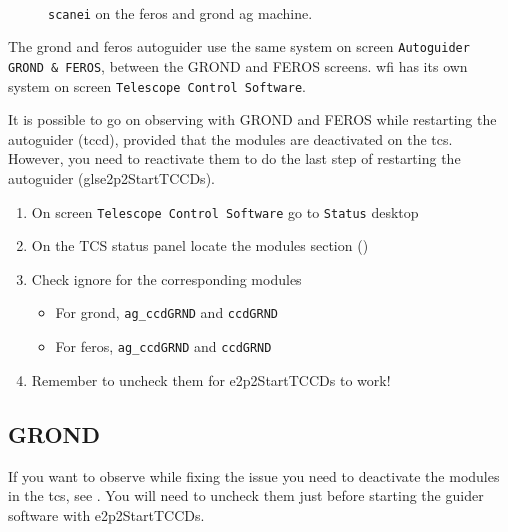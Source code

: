 \documentclass[11pt,fleqn,a4paper]{book}
\begin{document}
\begin{figure}[p!]
\begin{minipage}{0.48\linewidth}
\\
\end{minipage}
\hspace{0.02\linewidth}
\begin{minipage}{0.48\linewidth}
\end{minipage}
\caption[Command scanei to control environments]{\texttt{scanei} on the \gls{feros} and \gls{grond} 
\gls{ag} machine.}
\label{fig:agscanei}
\end{figure}


The \gls{grond} and \gls{feros} autoguider use the same system on screen \texttt{Autoguider GROND \& FEROS}, between the GROND and FEROS screens.  \gls{wfi} has its own system on screen \texttt{Telescope Control Software}.

It is possible to go on observing with GROND and FEROS while restarting the autoguider (\acrlong{tccd}), provided that the modules are deactivated on the \gls{tcs}. However, you need to reactivate them to do the last step of restarting the autoguider (gls{e2p2StartTCCDs}).

\label{proc:agmodules}
\begin{enumerate}
    \item On screen \texttt{Telescope Control Software} go to \texttt{Status} \gls{desktop}
    \item On the \gls{TCS status panel} locate the modules section ()
    \item Check ignore for the corresponding modules
    \begin{itemize}
        \item For \gls{grond}, \texttt{ag\_ccdGRND} and \texttt{ccdGRND}
        \item For \gls{feros}, \texttt{ag\_ccdGRND} and \texttt{ccdGRND}
    \end{itemize}
    \item Remember to uncheck them for \gls{e2p2StartTCCDs} to work!
\end{enumerate}

\subsection{GROND}
If you want to observe while fixing the issue you need to deactivate the modules in the \gls{tcs}, see .  You will need to uncheck them just before starting the guider software with \gls{e2p2StartTCCDs}.
\end{document}
